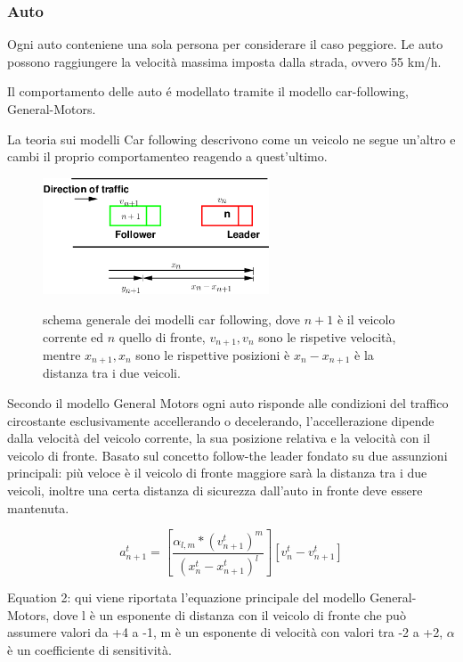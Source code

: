 
\newpage
\subsubsection{Auto}
Ogni auto conteniene una sola persona per considerare il caso peggiore.
Le auto possono raggiungere la velocità massima imposta dalla strada, ovvero 55 km/h.

Il comportamento delle auto é modellato tramite il modello car-following, General-Motors.

La teoria sui modelli Car following descrivono come un veicolo ne segue un'altro
e cambi il proprio comportamenteo reagendo a quest'ultimo.

\begin{figure}[ht]
  \centering
  \includegraphics[width=0.6\textwidth]{images/GM.png}
  \label{fig:general-motors-img}
  \caption{schema generale dei modelli car following, dove $n+1$ è il veicolo corrente ed $n$ quello di fronte, $v_{n+1}, v_{n}$ sono le rispetive velocità, mentre $x_{n+1}, x_{n}$ sono le rispettive posizioni è $x_{n} - x_{n + 1}$ è la distanza tra i due veicoli.}
\end{figure}

Secondo il modello General Motors ogni auto risponde alle condizioni del traffico circostante esclusivamente accellerando o decelerando, l'accellerazione dipende dalla velocità del veicolo corrente, la sua posizione relativa e la velocità con il veicolo di fronte.
Basato sul concetto follow-the leader fondato su due assunzioni principali:
più veloce è il veicolo di fronte maggiore sarà la distanza tra i due veicoli,
inoltre una certa distanza di sicurezza dall'auto in fronte deve essere mantenuta.

\begin{equation}
  a_{n+1}^{t} = [ \frac{\alpha_{l, m} * (v_{n + 1}^{t})^{m} }{ (x_{n}^{t} - x_{n + 1}^{t})^{l}}][v_{n}^{t} - v_{n + 1}^{t}]
  \label{eq:general-motors-eq}
\end{equation}

\noindent
Equation 2: qui viene riportata l'equazione principale del modello General-Motors,
dove l è un esponente di distanza con il veicolo di fronte che può assumere valori da +4 a -1,
m è un esponente di velocità con valori tra -2 a +2, $\alpha$ è un coefficiente di sensitività.

